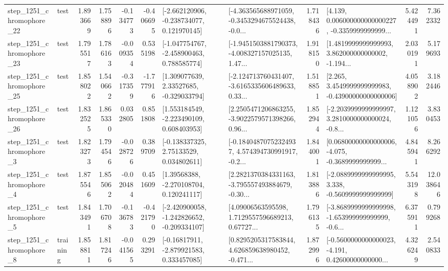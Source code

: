 \begin{tabular}{llrrrrllrlrr}
 step\_1251\_chromophore\_22 &      test &      1.893669 &    1.758896 &     -0.134773 & -0.406695 &   [-2.662120906, -0.238734077, 0.121970145] &  [-4.363565688971059, -0.3453294675524438, -0.0... &       1.718436 &  [4.139, 0.006000000000000227, -0.3359999999999... &            5.424491 &          7.362332 \\
 step\_1251\_chromophore\_23 &      test &      1.795517 &    1.786163 &     -0.009354 &  0.535198 &   [-1.047754767, -2.458900463, 0.788585774] &  [-1.9451503881790373, -4.008327157025135, 1.47... &       1.918150 &  [1.4819999999999993, 3.862000000000002, -1.194... &            2.030191 &          5.179693 \\
 step\_1251\_chromophore\_25 &      test &      1.858022 &    1.540662 &     -0.317359 & -1.777916 &     [1.309077639, 2.33527685, -0.329033794] &  [-2.124713760431407, -3.6165335606489633, 0.33... &       1.518851 &  [2.265, 3.4549999999999983, -0.43900000000000006] &            4.058902 &          3.182446 \\
 step\_1251\_chromophore\_26 &      test &      1.832525 &    1.865330 &      0.032805 &  0.851808 &    [1.553184549, -2.223490109, 0.608403953] &  [2.2505471206863255, -3.9022579571398266, 0.96... &       1.852944 &  [-2.2039999999999997, 3.2810000000000024, -0.8... &            1.121056 &          3.830453 \\
  step\_1251\_chromophore\_3 &      test &      1.823273 &    1.794546 &     -0.028726 &  0.389709 &     [-0.138337325, 2.75133529, 0.034802611] &  [-0.18404870752324937, 4.574394730991917, -0.2... &       1.844001 &  [0.06800000000000006, -4.075, -0.3689999999999... &            4.845941 &          8.266292 \\
  step\_1251\_chromophore\_4 &      test &      1.875546 &    1.855062 &     -0.020484 &  0.451609 &     [1.39568388, -2.270108704, 0.120241117] &  [2.2821370384331163, -3.795557493884679, -0.30... &       1.813886 &  [-2.0889999999999995, 3.338, -0.5609999999999999] &            5.543198 &         12.038646 \\
  step\_1251\_chromophore\_5 &      test &      1.843491 &    1.706708 &     -0.136783 & -0.421790 &  [-2.420900058, -1.242826652, -0.209334107] &  [4.09006563595598, 1.7129557596689213, 0.67727... &       1.796135 &  [-3.8689999999999998, -1.653999999999999, -0.6... &            6.375911 &          0.799268 \\
  step\_1251\_chromophore\_8 &  training &      1.858811 &    1.817246 &     -0.041565 &  0.293291 &    [-0.16817911, -2.879921583, 0.333457085] &  [0.8295205317583844, 4.626859638980452, -0.471... &       1.872996 &  [-0.5600000000000023, -4.191, 0.42600000000000... &            4.326249 &          2.540833 \\

\end{tabular}
